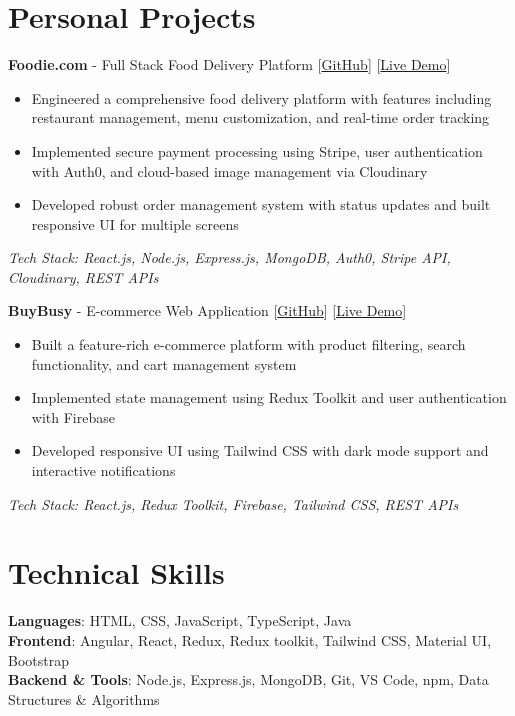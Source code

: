 \documentclass[letterpaper,11pt]{article}
\begin{document}
\section{Personal Projects}
\begin{itemize}[leftmargin=0.15in]
    \small{\item{
    \textbf{Foodie.com} - Full Stack Food Delivery Platform \hfill [\href{https://github.com/neerajsingh869/foody-frontend}{GitHub}] [\href{https://foody-frontend-27vz.onrender.com/}{Live Demo}]
    \begin{itemize}[leftmargin=0.15in]
        \item Engineered a comprehensive food delivery platform with features including restaurant management, menu customization, and real-time order tracking
        \item Implemented secure payment processing using Stripe, user authentication with Auth0, and cloud-based image management via Cloudinary
        \item Developed robust order management system with status updates and built responsive UI for multiple screens
    \end{itemize}
    \textit{Tech Stack: React.js, Node.js, Express.js, MongoDB, Auth0, Stripe API, Cloudinary, REST APIs}
    }}
    
    \small{\item{
    \textbf{BuyBusy} - E-commerce Web Application \hfill [\href{https://github.com/neerajsingh869/BuyBusy}{GitHub}] [\href{https://buybusy869.netlify.app/}{Live Demo}]
    \begin{itemize}[leftmargin=0.15in]
        \item Built a feature-rich e-commerce platform with product filtering, search functionality, and cart management system
        \item Implemented state management using Redux Toolkit and user authentication with Firebase
        \item Developed responsive UI using Tailwind CSS with dark mode support and interactive notifications
    \end{itemize}
    \textit{Tech Stack: React.js, Redux Toolkit, Firebase, Tailwind CSS, REST APIs}
    }}
\end{itemize}

\section{Technical Skills}
\begin{itemize}[leftmargin=0.15in, label={}]
    \small{\item{
    \textbf{Languages}{: HTML, CSS, JavaScript, TypeScript, Java} \\
    \textbf{Frontend}{: Angular, React, Redux, Redux toolkit, Tailwind CSS, Material UI, Bootstrap} \\
    \textbf{Backend \& Tools}{: Node.js, Express.js, MongoDB, Git, VS Code, npm, Data Structures \& Algorithms}
    }}
\end{itemize}
\end{document}
